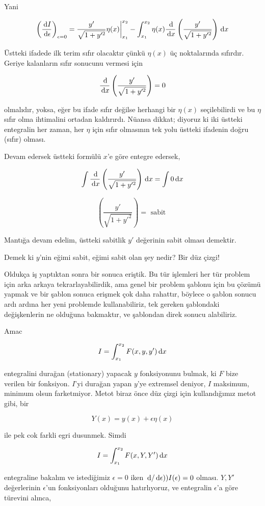 \documentclass[12pt,fleqn]{article}\usepackage{../../common}
\begin{document}
Yani

$$
\left( \frac{\,\mathrm{d} I}{\,\mathrm{d} \epsilon} \right)_{\epsilon = 0} =
\frac{y'}{\sqrt{1+y'^2}} \eta(x) \bigg\vert _{x_1}^{x_2} -
\int _{x_1}^{x_2} \eta(x) \frac{\,\mathrm{d}}{\,\mathrm{d} x} \left( \frac{y'}{\sqrt{1+y'^2}} \right)
\,\mathrm{d} x
$$

Üstteki ifadede ilk terim sıfır olacaktır çünkü $\eta(x)$ üç noktalarında
sıfırdır. Geriye kalanların sıfır sonucunu vermesi için 

$$
\frac{\,\mathrm{d}}{\,\mathrm{d} x} \left( \frac{y'}{\sqrt{1+y'^2}} \right) = 0
$$

olmalıdır, yoksa, eğer bu ifade sıfır değilse herhangi bir $\eta(x)$
seçilebilirdi ve bu $\eta$ sıfır olma ihtimalini ortadan kaldırırdı. Nüansa
dikkat; diyoruz ki iki üstteki entegralin her zaman, her $\eta$ için sıfır
olmasının tek yolu üstteki ifadenin doğru (sıfır) olması.

Devam edersek üstteki formülü $x$'e göre entegre edersek, 

$$
\int \frac{\,\mathrm{d}}{\,\mathrm{d} x} \left( \frac{y'}{\sqrt{1+y'^2}} \right) \,\mathrm{d} x = \int
0 \,\mathrm{d} x 
$$

$$
 \left( \frac{y'}{\sqrt{1+y'^2}} \right) = \textrm{ sabit }
$$

Mantığa devam edelim, üstteki sabitlik $y'$ değerinin sabit olması
demektir. 

Demek ki $y$'nin eğimi sabit, eğimi sabit olan şey nedir? Bir düz çizgi! 

Oldukça iş yaptıktan sonra bir sonuca eriştik. Bu tür işlemleri her tür
problem için arka arkaya tekrarlayabilirdik, ama genel bir problem şablonu
için bu çözümü yapmak ve bir şablon sonuca erişmek çok daha rahattır,
böylece o şablon sonucu ardı ardına her yeni problemde kullanabiliriz, tek
gereken şablondaki değişkenlerin ne olduğuna bakmaktır, ve şablondan direk
sonucu alabiliriz.

Amac 

$$
I = \int _{x_1}^{x_2} F(x,y,y') \,\mathrm{d} x
$$

entegralini durağan (stationary) yapacak $y$ fonksiyonunu bulmak, ki $F$
bize verilen bir fonksiyon. $I$'yi durağan yapan $y$'ye extremsel deniyor,
$I$ maksimum, minimum olsun farketmiyor. Metot biraz önce düz çizgi için
kullandığımız metot gibi, bir

$$
Y(x) = y(x) + \epsilon \eta(x)
$$

ile pek cok farkli egri dusunmek. Simdi 

$$
I = \int _{x_1}^{x_2} F(x,Y,Y') \,\mathrm{d} x
$$

entegraline bakalım ve istediğimiz $\epsilon = 0$ iken
$ \,\mathrm{d} / \,\mathrm{d} \epsilon) ) I(\epsilon) = 0$ olması. $Y,Y'$ değerlerinin
$\epsilon$'un fonksiyonları olduğunu hatırlıyoruz, ve entegralin
$\epsilon$'a göre türevini alınca, 
\end{document}
